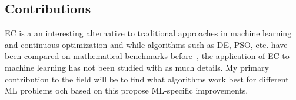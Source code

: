 \subsection{Contributions}

EC is a an interesting alternative to traditional approaches in machine learning and continuous optimization and while algorithms such as DE, PSO, etc. have been compared on mathematical benchmarks before~\cite{vesterstrom2004comparative, price1997differential}, the application of EC to machine learning has not been studied with as much details. My primary contribution to the field will be to find what algorithms work best for different ML problems och based on this propose ML-specific improvements.
